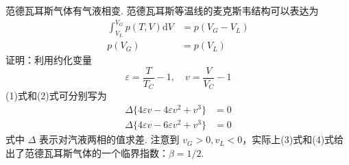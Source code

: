 \begin{exercise}\label{ex:14.11}
范德瓦耳斯气体有气液相变. 范德瓦耳斯等温线的麦克斯韦结构可以表达为
\begin{align}
  \int_{V_L}^{V_G} p(T,V) \mathrm{d}V &= p(V_G - V_L) \tag{1} \\
  p(V_G) &= p(V_L) \tag{2}
\end{align}
证明：利用约化变量
$$ \varepsilon = \frac{T}{T_C} - 1, \quad v = \frac{V}{V_C} - 1 $$
(1)式和(2)式可分别写为
\begin{align}
  \Delta \{ 4\varepsilon v - 4\varepsilon v^2 + v^3 \} &= 0 \tag{3} \\
  \Delta \{ 4\varepsilon v - 6\varepsilon v^2 + v^3 \} &= 0 \tag{4}
\end{align}
式中 $\Delta$ 表示对汽液两相的值求差. 注意到 $v_G > 0, v_L < 0$，实际上(3)式和(4)式给出了范德瓦耳斯气体的一个临界指数：$\beta = 1/2$.
\end{exercise}
